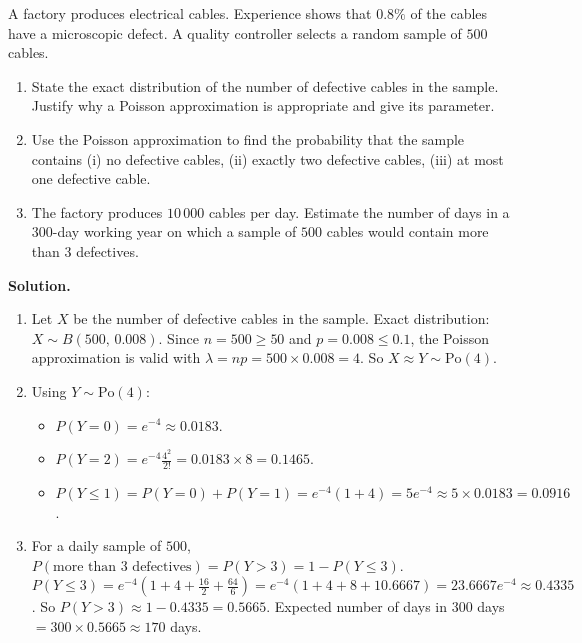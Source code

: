 \documentclass[11pt]{article}
\begin{document}
\begin{exoresolu}
A factory produces electrical cables. Experience shows that $0.8\%$ of the cables have a microscopic defect. A quality controller selects a random sample of $500$ cables.
\begin{enumerate}
\item State the exact distribution of the number of defective cables in the sample. Justify why a Poisson approximation is appropriate and give its parameter.
\item Use the Poisson approximation to find the probability that the sample contains (i) no defective cables, (ii) exactly two defective cables, (iii) at most one defective cable.
\item The factory produces $10\,000$ cables per day. Estimate the number of days in a $300$-day working year on which a sample of $500$ cables would contain more than $3$ defectives.
\end{enumerate}
\tcblower
\textbf{Solution.}
\begin{enumerate}
\item Let $X$ be the number of defective cables in the sample. Exact distribution: $X\sim B(500,\,0.008)$. Since $n=500\geq 50$ and $p=0.008\leq 0.1$, the Poisson approximation is valid with $\lambda = np = 500\times 0.008 = 4$. So $X\approx Y\sim\mathrm{Po}(4)$.
\item Using $Y\sim\mathrm{Po}(4)$:
\begin{itemize}
\item[(i)] $P(Y=0)=e^{-4}\approx 0.0183$.
\item[(ii)] $P(Y=2)=e^{-4}\frac{4^2}{2!}=0.0183\times 8 = 0.1465$.
\item[(iii)] $P(Y\leq 1)=P(Y=0)+P(Y=1)=e^{-4}(1+4)=5e^{-4}\approx 5\times 0.0183 = 0.0916$.
\end{itemize}
\item For a daily sample of $500$, $P(\text{more than 3 defectives}) = P(Y>3) = 1-P(Y\leq 3)$.
$P(Y\leq 3) = e^{-4}\left(1+4+\frac{16}{2}+\frac{64}{6}\right) = e^{-4}(1+4+8+10.6667) = 23.6667e^{-4} \approx 0.4335$.
So $P(Y>3) \approx 1-0.4335 = 0.5665$.
Expected number of days in $300$ days $= 300 \times 0.5665 \approx 170$ days.
\end{enumerate}
\end{exoresolu}
\end{document}
